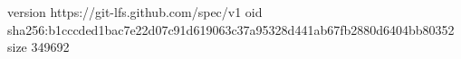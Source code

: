 version https://git-lfs.github.com/spec/v1
oid sha256:b1cccded1bac7e22d07c91d619063c37a95328d441ab67fb2880d6404bb80352
size 349692
